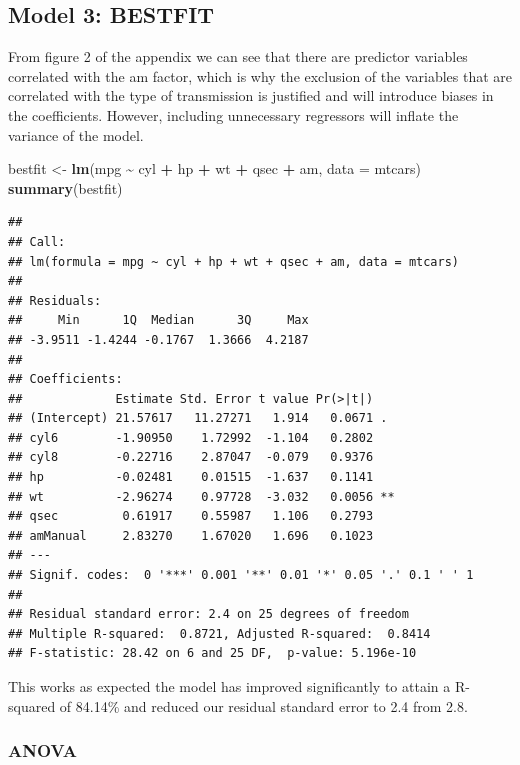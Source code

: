 \documentclass[]{article}
\newenvironment{Shaded}{\begin{snugshade}}{\end{snugshade}}
\newcommand{\DataTypeTok}[1]{\textcolor[rgb]{0.13,0.29,0.53}{#1}}
\newcommand{\KeywordTok}[1]{\textcolor[rgb]{0.13,0.29,0.53}{\textbf{#1}}}
\newcommand{\NormalTok}[1]{#1}
\newcommand{\OperatorTok}[1]{\textcolor[rgb]{0.81,0.36,0.00}{\textbf{#1}}}
\newcommand{\StringTok}[1]{\textcolor[rgb]{0.31,0.60,0.02}{#1}}
\begin{document}
\hypertarget{model-3-bestfit}{%
\subsection{Model 3: BESTFIT}\label{model-3-bestfit}}

From figure 2 of the appendix we can see that there are predictor
variables correlated with the am factor, which is why the exclusion of
the variables that are correlated with the type of transmission is
justified and will introduce biases in the coefficients. However,
including unnecessary regressors will inflate the variance of the model.

\begin{Shaded}
\begin{Highlighting}[]
\NormalTok{bestfit \textless{}{-}}\StringTok{ }\KeywordTok{lm}\NormalTok{(mpg }\OperatorTok{\textasciitilde{}}\StringTok{ }\NormalTok{cyl }\OperatorTok{+}\StringTok{ }\NormalTok{hp }\OperatorTok{+}\StringTok{ }\NormalTok{wt }\OperatorTok{+}\StringTok{ }\NormalTok{qsec }\OperatorTok{+}\StringTok{ }\NormalTok{am, }\DataTypeTok{data =}\NormalTok{ mtcars)}
\KeywordTok{summary}\NormalTok{(bestfit)}
\end{Highlighting}
\end{Shaded}

\begin{verbatim}
## 
## Call:
## lm(formula = mpg ~ cyl + hp + wt + qsec + am, data = mtcars)
## 
## Residuals:
##     Min      1Q  Median      3Q     Max 
## -3.9511 -1.4244 -0.1767  1.3666  4.2187 
## 
## Coefficients:
##             Estimate Std. Error t value Pr(>|t|)   
## (Intercept) 21.57617   11.27271   1.914   0.0671 . 
## cyl6        -1.90950    1.72992  -1.104   0.2802   
## cyl8        -0.22716    2.87047  -0.079   0.9376   
## hp          -0.02481    0.01515  -1.637   0.1141   
## wt          -2.96274    0.97728  -3.032   0.0056 **
## qsec         0.61917    0.55987   1.106   0.2793   
## amManual     2.83270    1.67020   1.696   0.1023   
## ---
## Signif. codes:  0 '***' 0.001 '**' 0.01 '*' 0.05 '.' 0.1 ' ' 1
## 
## Residual standard error: 2.4 on 25 degrees of freedom
## Multiple R-squared:  0.8721, Adjusted R-squared:  0.8414 
## F-statistic: 28.42 on 6 and 25 DF,  p-value: 5.196e-10
\end{verbatim}

This works as expected the model has improved significantly to attain a
R-squared of 84.14\% and reduced our residual standard error to 2.4 from
2.8.

\hypertarget{anova}{%
\subsubsection{ANOVA}\label{anova}}
\end{document}
